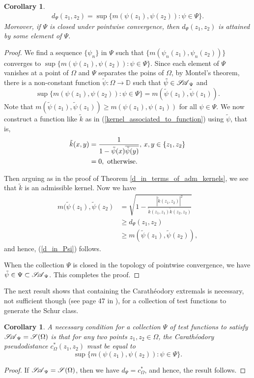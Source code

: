 \documentclass[12pt]{amsart}
\newtheorem{corollary}[theorem]{Corollary}
\theoremstyle{definition}
\numberwithin{equation}{section}
\newcommand{\SA}{\mathscr{S\mspace{-5mu}A}}
\begin{document}
\begin{corollary}
	\begin{align}\label{d_in_Psi}
		d_\Psi (z_1,z_2)=\sup \Big\{ m(\psi(z_1), \psi(z_2)):\psi\in \Psi\Big\}.
	\end{align}
	Moreover, if $\Psi$ is closed under pointwise convergence, then $d_\Psi (z_1,z_2)$ is attained by some element of $\Psi$.
\end{corollary}

\begin{proof} 
	We find a sequence $\{\psi_n\}$ in $\Psi$ such that $\{m(\psi_n(z_1),\psi_n(z_2))\}$ converges to $\sup \Big\{ m(\psi(z_1), \psi(z_2)):\psi\in \Psi\Big\}$. Since each element of $\Psi$ vanishes at a point of $\Omega$ and $\Psi$ separates the poins of $\Omega$, by Montel's theorem, there is a non-constant function $\tilde{\psi}:\Omega \rightarrow\mathbb{D}$ such that $\tilde{\psi}\in \SA_\Psi$ and $$\sup \Big\{ m(\psi(z_1), \psi(z_2)):\psi\in \Psi\Big\}=m(\tilde{\psi}(z_1), \tilde{\psi}(z_1)).$$
	Note that $m(\tilde{\psi}(z_1), \tilde{\psi}(z_1))\geq m(\psi(z_1), \psi(z_1))$ for all $\psi\in \Psi$.
	We now construct a function like $\tilde{k}$ as in (\ref{kernel_associated_to_function}) using $\tilde{\psi}$, that is,
		\begin{align*}
		\tilde{k}(x,y)&=\frac{1}{1- \tilde{\psi}(x)\overline{\tilde{\psi}(y)}},\,x,y\in\{z_1,z_2\}\\
		&=0,\,\,\text{otherwise}.\notag
	\end{align*} 
	
	Then arguing as in the proof of Theorem \ref{d_in_terms_of_adm_kernels}, we see that $\tilde{k}$ is an admissible kernel. Now we have
	\begin{align*}
		m(\tilde{\psi}(z_1), \tilde{\psi}(z_2)&=\sqrt{1-\frac{|\tilde{k}(z_1, z_2)|^2}{\tilde{k}(z_1,z_1)\tilde{k}(z_2,z_2)}}\\
		&\geq d_\Psi (z_1,z_2)\\
		&\geq m(\tilde{\psi}(z_1), \tilde{\psi}(z_2)),
	\end{align*}  
	and hence, (\ref{d_in_Psi}) follows.
	
	
	
	
	
	 When the collection $\Psi$ is closed in the topology of pointwise convergence, we have $\tilde{\psi}\in \Psi\subset \SA_\Psi$. This completes the proof.
\end{proof}

The next result shows that containing the Carath\'eodory extremals is necessary, not sufficient though (see page 47 in \cite{Agler1990}), for a collection of test functions to generate the Schur class.
\begin{corollary}\label{CaraAndTest}
	A necessary condition for a collection $\Psi$ of test functions to satisfy $\SA_\Psi=\mathscr{S}(\Omega)$ is that for any two points $z_1,z_2\in \Omega$, the Carath\'eodory pseudodistance $c_\Omega ^* (z_1,z_2)$ must be equal to $$\sup \Big\{ m(\psi(z_1), \psi(z_2)):\psi\in \Psi\Big\}.$$
\end{corollary}
\begin{proof}
	If $\SA_\Psi=\mathscr{S}(\Omega)$, then we have $d_\Psi =c^* _\Omega$, and hence, the result follows.
\end{proof}
\end{document}
